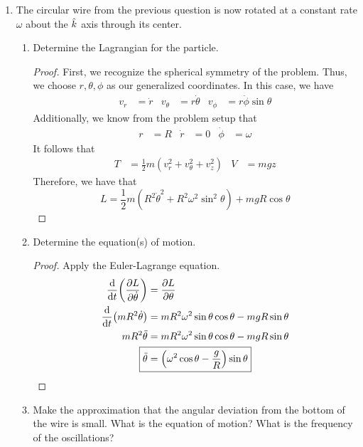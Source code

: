 \documentclass[../psets.tex]{subfiles}
\begin{document}
\begin{enumerate}
    \item The circular wire from the previous question is now rotated at a constant rate $\omega$ about the $\hat{k}$ axis through its center.
    \begin{enumerate}
        \item Determine the Lagrangian for the particle.
        \begin{proof}
            First, we recognize the spherical symmetry of the problem. Thus, we choose $r,\theta,\phi$ as our generalized coordinates. In this case, we have
            \begin{align*}
                v_r &= \dot{r}&
                v_\theta &= r\dot{\theta}&
                v_\phi &= r\dot{\phi}\sin\theta
            \end{align*}
            Additionally, we know from the problem setup that
            \begin{align*}
                r &= R&
                \dot{r} &= 0&
                \dot{\phi} &= \omega
            \end{align*}
            It follows that
            \begin{align*}
                T &= \frac{1}{2}m(v_r^2+v_\theta^2+v_z^2)&
                V &= mgz
            \end{align*}
            Therefore, we have that
            \begin{equation*}
                \boxed{L = \frac{1}{2}m(R^2\dot{\theta}^2+R^2\omega^2\sin^2\theta)+mgR\cos\theta}
            \end{equation*}
        \end{proof}
        \item Determine the equation(s) of motion.
        \begin{proof}
            Apply the Euler-Lagrange equation.
            \begin{align*}
                \dv{t}(\pdv{L}{\dot{\theta}}) &= \pdv{L}{\theta}\\
                \dv{t}(mR^2\dot{\theta}) &= mR^2\omega^2\sin\theta\cos\theta-mgR\sin\theta\\
                mR^2\ddot{\theta} &= mR^2\omega^2\sin\theta\cos\theta-mgR\sin\theta\\
                \Aboxed{\ddot{\theta} &= \left( \omega^2\cos\theta-\frac{g}{R} \right)\sin\theta}
            \end{align*}
        \end{proof}
        \item Make the approximation that the angular deviation from the bottom of the wire is small. What is the equation of motion? What is the frequency of the oscillations?

\end{enumerate}
\end{enumerate}
\end{document}
